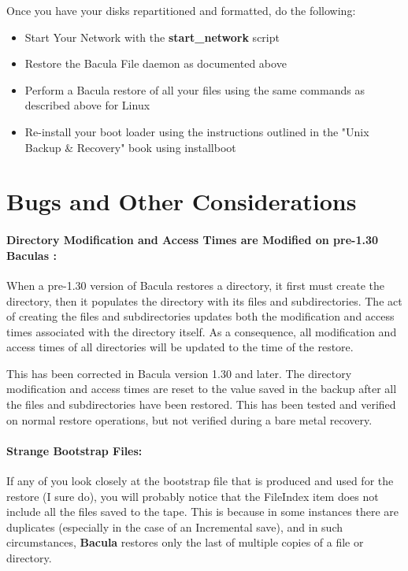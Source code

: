 Once you have your disks repartitioned and formatted, do the following: 

\begin{itemize}
\item Start Your Network with the {\bf start\_network} script  
\item Restore the Bacula File daemon as documented above  
\item Perform a Bacula restore of all your files using the same  commands as
   described above for Linux  
\item Re-install your boot loader using the instructions outlined  in the
   "Unix Backup \& Recovery" book  using installboot 
\end{itemize}

\label{genbugs}

\section{Bugs and Other Considerations}

\paragraph*{Directory Modification and Access Times are Modified on pre-1.30
Baculas :}

When a pre-1.30 version of Bacula restores a directory, it first must create
the directory, then it populates the directory with its files and
subdirectories. The act of creating the files and subdirectories updates both
the modification and access times associated with the directory itself. As a
consequence, all modification and access times of all directories will be
updated to the time of the restore. 

This has been corrected in Bacula version 1.30 and later. The directory
modification and access times are reset to the value saved in the backup after
all the files and subdirectories have been restored. This has been tested and
verified on normal restore operations, but not verified during a bare metal
recovery. 

\paragraph*{Strange Bootstrap Files:}

If any of you look closely at the bootstrap file that is produced and used for
the restore (I sure do), you will probably notice that the FileIndex item does
not include all the files saved to the tape. This is because in some instances
there are duplicates (especially in the case of an Incremental save), and in
such circumstances, {\bf Bacula} restores only the last of multiple copies of
a file or directory. 

